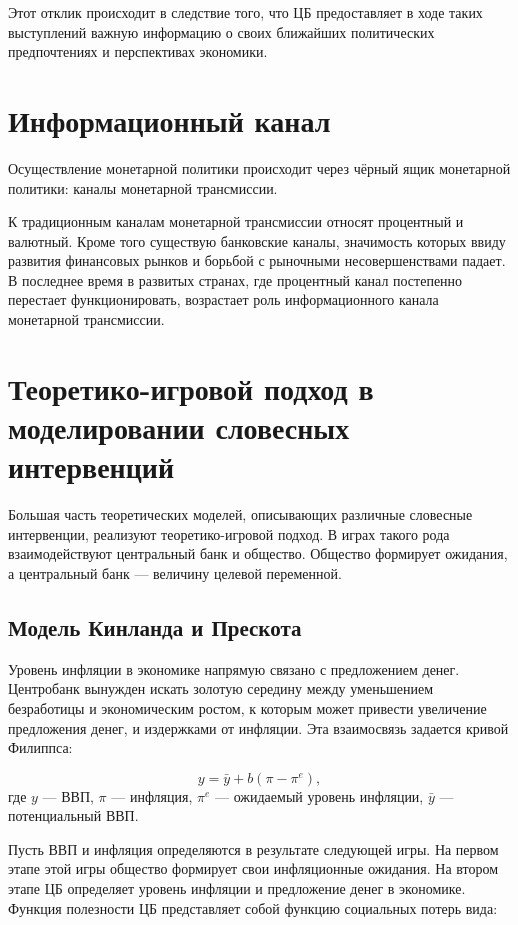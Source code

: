Этот отклик происходит в следствие того, что ЦБ предоставляет в ходе таких выступлений важную информацию о своих ближайших политических предпочтениях и перспективах экономики. 

\section{Информационный канал}

Осуществление монетарной политики происходит через чёрный ящик монетарной политики: каналы монетарной трансмиссии.

К традиционным каналам монетарной трансмиссии относят процентный и валютный. Кроме того существую банковские каналы, значимость которых ввиду развития финансовых рынков и борьбой с рыночными несовершенствами падает. В последнее время в развитых странах, где процентный канал постепенно перестает функционировать, возрастает роль информационного канала монетарной трансмиссии.

\section{Теоретико-игровой подход в моделировании словесных интервенций}

Большая часть теоретических моделей, описывающих различные словесные интервенции, реализуют теоретико-игровой подход. В играх такого рода взаимодействуют центральный банк и общество. Общество формирует ожидания, а центральный банк --- величину целевой переменной.

\subsection{Модель Кинланда и Прескота}

Уровень инфляции в экономике напрямую связано с предложением денег. Центробанк вынужден искать золотую середину между уменьшением безработицы и экономическим ростом, к которым может привести увеличение предложения денег, и  издержками от инфляции. Эта взаимосвязь задается кривой Филиппса:

\begin{equation}\label{T3-1}
y = \bar y + b(\pi-\pi^e),
\end{equation}
где $y$ --- ВВП, $\pi$ --- инфляция, $\pi^e$ --- ожидаемый уровень инфляции, $\bar y$ --- потенциальный ВВП.
 
Пусть ВВП и инфляция определяются в результате следующей игры. На первом этапе этой игры общество формирует свои инфляционные ожидания. На втором этапе ЦБ определяет уровень инфляции и предложение денег в экономике. 
Функция полезности ЦБ представляет собой функцию социальных потерь вида:

